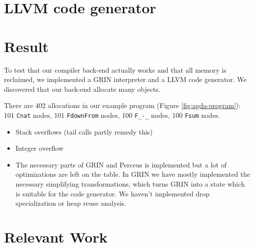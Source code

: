 \documentclass{article}
\begin{document}
\section{LLVM code generator}

\section{Result}

To test that our compiler back-end actually works and that all memory is reclaimed, we implemented a GRIN interpreter and a LLVM code generator.
We discovered that our back-end allocate many objects. 

There are 402 allocations in our example program (Figure \ref{fig:agda-program}): 
101 \texttt{Cnat} nodes, 101 \texttt{FdownFrom} nodes, 100 \texttt{F\_-\_} nodes, 100 \texttt{Fsum} nodes.

\begin{itemize}
\item Stack overflows (tail calls partly remedy this)
\item Integer overflow
\item The necessary parts of GRIN and Perceus is implemented but a lot of optimizations are 
      left on the table. In GRIN we have mostly implemented the necessary simplifying transformations,
      which turns GRIN into a state which is suitable for the code generator.
      We haven't implemented drop specialization or heap reuse analysis.
\end{itemize}

\section{Relevant Work}
\end{document}
